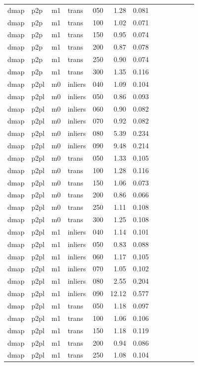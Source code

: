 \begin{table}[htbp]
\begin{tabular}{lllllrrrrrrrr}
  dmap & p2p & m1 & trans & 050 & 1.28 & 0.081 \\
  dmap & p2p & m1 & trans & 100 & 1.02 & 0.071 \\
  dmap & p2p & m1 & trans & 150 & 0.95 & 0.074 \\
  dmap & p2p & m1 & trans & 200 & 0.87 & 0.078 \\
  dmap & p2p & m1 & trans & 250 & 0.90 & 0.074 \\
  dmap & p2p & m1 & trans & 300 & 1.35 & 0.116 \\
  dmap & p2pl & m0 & inliers & 040 & 1.09 & 0.104 \\
  dmap & p2pl & m0 & inliers & 050 & 0.86 & 0.093 \\
  dmap & p2pl & m0 & inliers & 060 & 0.90 & 0.082 \\
  dmap & p2pl & m0 & inliers & 070 & 0.92 & 0.082 \\
  dmap & p2pl & m0 & inliers & 080 & 5.39 & 0.234 \\
  dmap & p2pl & m0 & inliers & 090 & 9.48 & 0.214 \\
  dmap & p2pl & m0 & trans & 050 & 1.33 & 0.105 \\
  dmap & p2pl & m0 & trans & 100 & 1.28 & 0.116 \\
  dmap & p2pl & m0 & trans & 150 & 1.06 & 0.073 \\
  dmap & p2pl & m0 & trans & 200 & 0.86 & 0.066 \\
  dmap & p2pl & m0 & trans & 250 & 1.11 & 0.108 \\
  dmap & p2pl & m0 & trans & 300 & 1.25 & 0.108 \\
  dmap & p2pl & m1 & inliers & 040 & 1.14 & 0.101 \\
  dmap & p2pl & m1 & inliers & 050 & 0.83 & 0.088 \\
  dmap & p2pl & m1 & inliers & 060 & 1.17 & 0.105 \\
  dmap & p2pl & m1 & inliers & 070 & 1.05 & 0.102 \\
  dmap & p2pl & m1 & inliers & 080 & 2.55 & 0.204 \\
  dmap & p2pl & m1 & inliers & 090 & 12.12 & 0.577 \\
  dmap & p2pl & m1 & trans & 050 & 1.18 & 0.097 \\
  dmap & p2pl & m1 & trans & 100 & 1.06 & 0.106 \\
  dmap & p2pl & m1 & trans & 150 & 1.18 & 0.119 \\
  dmap & p2pl & m1 & trans & 200 & 0.94 & 0.086 \\
  dmap & p2pl & m1 & trans & 250 & 1.08 & 0.104 \\

\end{tabular}
\end{table}
